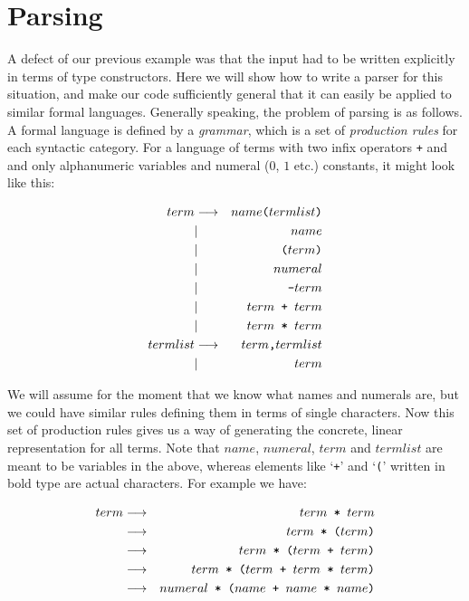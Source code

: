 \section{Parsing}

A defect of our previous example was that the input had to be written
explicitly in terms of type constructors. Here we will show how to write a
parser for this situation, and make our code sufficiently general that it can
easily be applied to similar formal languages. Generally speaking, the problem
of parsing is as follows. A formal language is defined by a {\em grammar},
which is a set of {\em production rules} for each syntactic category. For a
language of terms with two infix operators {\tt +} and {\tt *} and only
alphanumeric variables and numeral ($0$, $1$ etc.) constants, it might look
like this:

\begin{eqnarray*}
term     & \goesto & name{\verb!(!} termlist {\verb!)!}         \\
         & |       & name                                       \\
         & |       & {\verb!(!} term {\verb!)!}                 \\
         & |       & numeral                                    \\
         & |       & {\verb!-!} term                            \\
         & |       & term {\verb! + !} term                     \\
         & |       & term {\verb! * !} term                     \\
termlist & \goesto & term {\verb!,!} termlist                   \\
         & |       & term
\end{eqnarray*}

We will assume for the moment that we know what names and numerals are, but we
could have similar rules defining them in terms of single characters. Now this
set of production rules gives us a way of generating the concrete, linear
representation for all terms. Note that $name$, $numeral$, $term$ and
$termlist$ are meant to be variables in the above, whereas elements like
`{\verb!+!}' and `{\verb!(!}' written in bold type are actual characters. For
example we have:

\begin{eqnarray*}
term     & \goesto & term {\verb! * !} term                             \\
         & \goesto & term {\verb! * !} {\verb!(!} term {\verb!)!}       \\
         & \goesto & term {\verb! * !} {\verb!(!}
                                term {\verb! + !} term {\verb!)!}       \\
         & \goesto & term {\verb! * !} {\verb!(!}
                     term {\verb! + !} term {\verb! * !} term {\verb!)!}\\
         & \goesto & numeral {\verb! * !} {\verb!(!}
                     name {\verb! + !} name {\verb! * !} name {\verb!)!}
\end{eqnarray*}


